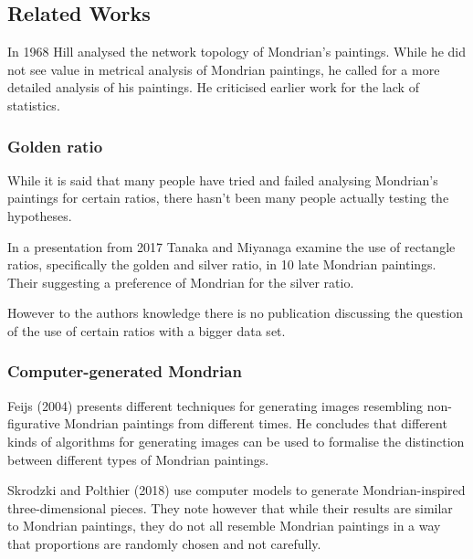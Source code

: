 \subsection{Related Works}


In 1968 Hill \cite{Hill1968} analysed the network topology of Mondrian's paintings.
While he did not see value in metrical analysis of Mondrian paintings, he called
for a more detailed analysis of his paintings. He criticised earlier work for
the lack of statistics.

\subsubsection{Golden ratio}

\cite{Livio2002}

While it is said that many people have tried and failed analysing Mondrian's
paintings for certain ratios, there hasn't been many people actually testing
the hypotheses.

In a presentation from 2017 Tanaka and Miyanaga \cite{Tanaka2017} examine the use
of rectangle ratios, specifically the golden and silver ratio, in 10 late
Mondrian paintings. Their suggesting a preference of Mondrian for the silver
ratio.

However to the authors knowledge there is no publication discussing the question of
the use of certain ratios with a bigger data set.

\subsubsection{Computer-generated Mondrian}



Feijs (2004)\cite{Feijs2004} presents different techniques for generating images
resembling non-figurative Mondrian paintings from different times. He  concludes
that different kinds of algorithms for generating images can be used to
formalise the distinction between different types of Mondrian paintings.


Skrodzki and Polthier (2018) \cite{Skrodzki2018} use computer models to generate
Mondrian-inspired three-dimensional pieces. They note however that while their
results are similar to Mondrian paintings, they do not all resemble Mondrian
paintings in a way that proportions are randomly chosen and not carefully.
